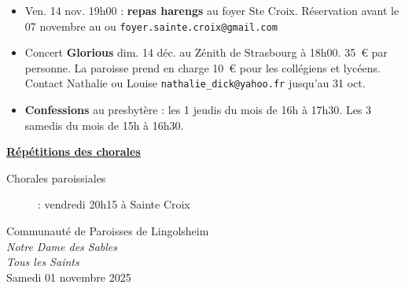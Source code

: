 \documentclass[french,11pt]{article}
\newcommand{\JournalName}[1]{%
		\begin{center}
            \Large \usefont{T1}{augie}{m}{n}
			#1%
		\end{center}
		\par \normalsize \normalfont}
\newcommand*{\footer}{..}
\newcommand{\NewsItem}[1]{%
\vspace{3pt}
\underline{\textbf{#1}}
		  }
\begin{document}
\begin{itemize}
\item Ven. 14 nov. 19h00 : \textbf{repas harengs} au foyer Ste Croix. Réservation avant le 07 novembre au  ou \texttt{foyer.sainte.croix@gmail.com}
\item
Concert \textbf{Glorious} dim. 14 déc. au Zénith de Strasbourg à 18h00. 35~€ par personne. La paroisse prend en charge 10~€ pour les collégiens et lycéens. Contact Nathalie ou Louise \texttt{nathalie\_dick@yahoo.fr} jusqu'au 31 oct.
\item
\textbf{Confessions} au presbytère : les 1\iers{} jeudis du mois de 16h à 17h30. Les 3\iemes{} samedis du mois de 15h à 16h30.
\end{itemize}

\NewsItem{Répétitions des chorales}
\begin{description}
\item[Chorales paroissiales] : vendredi 20h15 à Sainte Croix
\end{description}



\newpage

\JournalName{Communauté de Paroisses de Lingolsheim \\
\normalsize \textit{Notre Dame des Sables}
\\  \normalsize \textit{Tous les Saints}
\\ \large Samedi 01 novembre 2025}


\begin{minipage}[h]{1.0\linewidth}
\setlength{\parindent}{1em}

\end{minipage}
\end{document}
